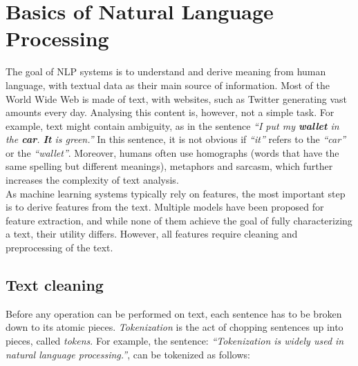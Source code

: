 \section{Basics of Natural Language Processing}\label{sec:NLP}
The goal of NLP systems is to understand and derive meaning from human language, with textual data as their main source of information.
Most of the World Wide Web is made of text, with websites, such as Twitter generating vast amounts every day. Analysing this content is, however, not a simple task. For example, text might contain ambiguity, as in the sentence \emph{``I put my \textbf{wallet} in the  \textbf{car}.  \textbf{It} is green.''} In this sentence, it is not obvious if \emph{``it''} refers to the \emph{``car''} or the  \emph{``wallet''}. Moreover, humans often use homographs (words that have the same spelling but different meanings), metaphors and sarcasm, which further increases the complexity of text analysis.\\
As machine learning systems typically rely on features, the most important step is to derive features from the text. Multiple models have been proposed for feature extraction, and while none of them achieve the goal of fully characterizing a text, their utility differs.
%
However, all features require cleaning and preprocessing of the text. 

\subsection{Text cleaning}\label{subsec:cleaning}
Before any operation can be performed on text, each sentence has to be broken down to its atomic pieces. \emph{Tokenization} is the act of chopping sentences up into pieces, called \emph{tokens}. For example, the sentence: \emph{``Tokenization is widely used in natural language processing.''}, can be tokenized as follows:\\

